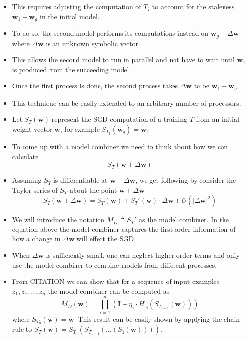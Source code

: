 \begin{itemize}
    \item This requires adjusting the computation of $T_2$ to account for the staleness $\bm{w}_{1} - \bm{w}_{g}$ in the initial model.
    \item To do so, the second model performs its computations instead on $\bm{w}_{g} - \Delta \bm{w}$ where $\Delta \bm{w}$ is an unknown symbolic vector
    \item This allows the second model to run in parallel and not have to wait until $\bm{w}_{1}$ is produced from the succeeding model.
    \item Once the first process is done, the second process takes $\Delta \bm{w}$ to be $\bm{w}_{1} - \bm{w}_{g}$
    \item This technique can be easily extended to an arbitrary number of processors.
\end{itemize}

\begin{itemize}
    \item Let $S_{T} \left( \bm{w} \right)$ represent the SGD computation of a training $T$ from an initial weight vector $\bm{w}$, for example $S_{T_{1}} \left( \bm{w}_{g} \right) = \bm{w}_{1}$
    \item To come up with a model combiner we need to think about how we can calculate
    \[
        S_{T} \left( \bm{w} + \Delta \bm{w} \right)
    \]
    \item Assuming $S_{T}$ is differentiable at $\bm{w} + \Delta \bm{w}$, we get following by consider the Taylor series of $S_{T}$ about the point $\bm{w} + \Delta \bm{w}$
    \[
        S_{T} \left( \bm{w} + \Delta \bm{w} \right) = S_{T} \left( \bm{w} \right) + S_{T} ' \left( \bm{w} \right) \cdot \Delta \bm{w} + \mathcal{O} \left( \left| \Delta \bm{w} \right|^{2} \right)
    \]
    \item We will introduce the notation $M_{D} \triangleq S_{T}'$ as the model combiner. In the equation above the model combiner captures the first order information of how a change in $\Delta \bm{w}$ will effect the SGD
    \item When $\Delta \bm{w}$ is sufficiently small, one can neglect higher order terms and only use the model combiner to combine models from different processes.
    \item From CITATION we can show that for a sequence of input examples $z_1 , z_2, \ldots , z_{n}$ the model combiner can be computed as
    \[
        M_{D} (\bm{w}) = \prod_{i=1}^{n} \left( \bm{I} - \eta_{i} \cdot H_{z_{i}} \left( S_{T_{i-1}} \left( \bm{w} \right) \right) \right)
    \]
    where $S_{T_{0}} \left( \bm{w} \right) = \bm{w}$. This result can be easily shown by applying the chain rule to $S_{T} \left( \bm{w} \right) = S_{T_{n}} \left( S_{T_{n-1}} \left( \ldots \left( S_{1} \left( \bm{w} \right) \right) \right) \right)$.
\end{itemize}

